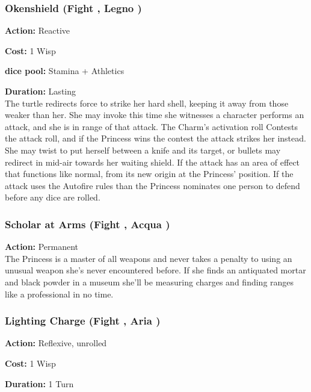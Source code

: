 \subsubsection*{Okenshield (Fight \textbullet, Legno \textbullet)}

\noindent \textbf{Action:} Reactive

\noindent \textbf{Cost:} 1 Wisp

\noindent \textbf{dice pool:} Stamina + Athletics

\noindent \textbf{Duration:} Lasting\\

\noindent The turtle redirects force to strike her hard shell, keeping it away from those weaker than her. She may invoke this time she witnesses a character performs an attack, and she is in range of that attack. The Charm's activation roll Contests the attack roll, and if the Princess wins the contest the attack strikes her instead. She may twist to put herself between a knife and its target, or bullets may redirect in mid-air towards her waiting shield. If the attack has an area of effect that functions like normal, from its new origin at the Princess' position. If the attack uses the Autofire rules than the Princess nominates one person to defend before any dice are rolled. 

\subsubsection*{Scholar at Arms (Fight \textbullet, Acqua \textbullet)}

\noindent \textbf{Action:} Permanent\\

\noindent The Princess is a master of all weapons and never takes a penalty to using an unusual weapon she's never encountered before. If she finds an antiquated mortar and black powder in a museum she'll be measuring charges and finding ranges like a professional in no time. 

\subsubsection*{Lighting Charge (Fight \textbullet, Aria \textbullet)}

\noindent \textbf{Action:} Reflexive, unrolled

\noindent \textbf{Cost:} 1 Wisp

\noindent \textbf{Duration:} 1 Turn\\

